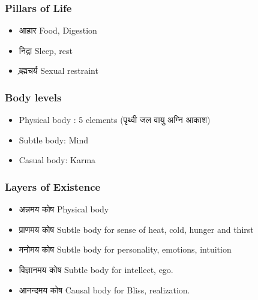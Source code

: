 \begin{frame}[fragile]\frametitle{Pillars of Life}

	\begin{itemize}
	\item  आहार Food, Digestion
	\item  निद्रा Sleep, rest
	\item  ब्र्ह्मचर्य Sexual restraint
	\end{itemize}

\end{frame}

\begin{frame}[fragile]\frametitle{Body levels}
	\begin{itemize}
	\item  Physical body : 5 elements (पृथ्वी जल वायु अग्नि आकाश)
	\item Subtle body: Mind
	\item Casual body: Karma
	
	\end{itemize}

\end{frame}

\begin{frame}[fragile]\frametitle{Layers of Existence}
	\begin{itemize}
	\item अन्नमय कोष Physical body 
	\item प्राणमय कोष Subtle body for sense of heat, cold, hunger and thirst
	\item मनोमय कोष Subtle body for personality, emotions, intuition
	\item विज्ञानमय कोष Subtle body for intellect, ego.
	\item आनन्दमय कोष  Causal body for Bliss, realization.
	\end{itemize}

\end{frame}

